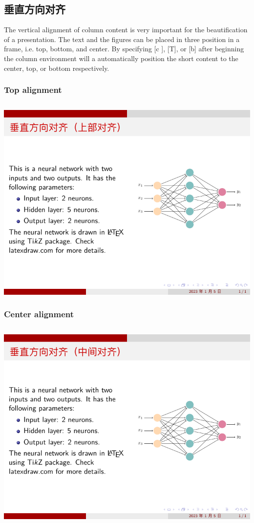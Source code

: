 \subsection{垂直方向对齐}

The vertical alignment of column content is very important for the beautification of a presentation. The text and the figures can be placed in three position in a frame, i.e. top, bottom, and center. By specifying [c ], [T], or [b] after beginning the column environment will a automatically position the short content to the center, top, or bottom respectively.

\subsubsection{Top alignment}

\inputminted[linenos=true]{latex}{examples/beamer/column-top-alignment.tex}

\includegraphics{examples/beamer/column-top-alignment.pdf}

\subsubsection{Center alignment}

\inputminted[linenos=true]{latex}{examples/beamer/column-center-alignment.tex}

\includegraphics{examples/beamer/column-center-alignment.pdf}

